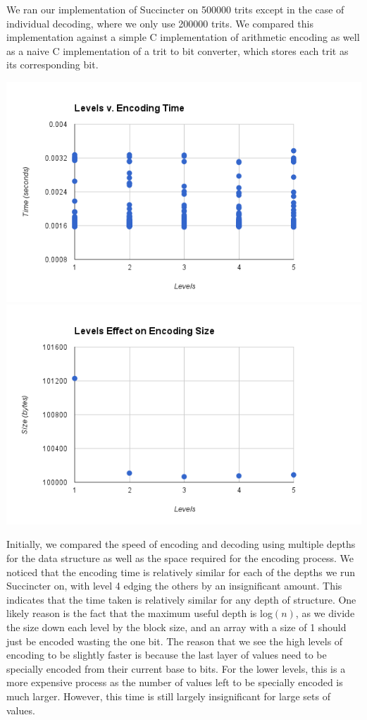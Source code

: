 \documentclass{article}
\begin{document}
We ran our implementation of Succincter on 500000 trits except in the case of individual decoding, where we only use 200000 trits. We compared this implementation against a simple C implementation of arithmetic encoding as well as a naive C implementation of a trit to bit converter, which stores each trit as its corresponding bit.

\includegraphics[scale=0.4]{images/betterlevel_v_encode}
\includegraphics[scale=0.4]{images/lvl_encodingsize}
\afterpage{\vfill}

Initially, we compared the speed of encoding and decoding using multiple depths for the data structure as well as the space required for the encoding process. We noticed that the encoding time is relatively similar for each of the depths we run Succincter on, with level 4 edging the others by an insignificant amount. This indicates that the time taken is relatively similar for any depth of structure. One likely reason is the fact that the maximum useful depth is log$(n)$, as we divide the size down each level by the block size, and an array with a size of 1 should just be encoded wasting the one bit. The reason that we see the high levels of encoding to be slightly faster is because the last layer of values need to be specially encoded from their current base to bits. For the lower levels, this is a more expensive process as the number of values left to be specially encoded is much larger. However, this time is still largely insignificant for large sets of values. \\
\end{document}
